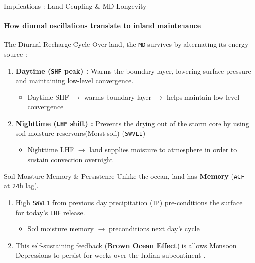 \documentclass[8pt, aspectratio=169]{beamer}
\begin{document}
\begin{frame}{Implications : Land-Coupling \& MD Longevity}
    \framesubtitle{How diurnal oscillations translate to inland maintenance}

    \footnotesize
    \begin{block}{The Diurnal Recharge Cycle}
        Over land, the \texttt{MD} survives by alternating its energy source :
        \begin{enumerate}
            \footnotesize
            \item \textbf{Daytime (\texttt{SHF} peak) :} Warms the boundary layer, lowering surface pressure and maintaining low-level convergence.
                \footnotesize
                \begin{itemize}
                    \tiny
                    \item Daytime SHF $\rightarrow$ warms boundary layer $\rightarrow$ helps maintain low-level convergence
                \end{itemize}
            \footnotesize
            \item \textbf{Nighttime (\texttt{LHF} shift) :} Prevents the drying out of the storm core by using soil moisture reservoirs(Moist soil) (\texttt{SWVL1}).
                \begin{itemize}
                    \tiny
                    \item Nighttime LHF $\rightarrow$ land supplies moisture to atmosphere in order to sustain convection overnight
                \end{itemize}
        \end{enumerate}
    \end{block}

    \footnotesize
    \begin{block}{Soil Moisture Memory \& Persistence}
        Unlike the ocean, land has \textbf{Memory} (\texttt{ACF} at \texttt{24h} lag).
        \begin{enumerate}
            \item High \texttt{SWVL1} from previous day precipitation (\texttt{TP}) pre-conditions the surface for today's \texttt{LHF} release.
                \begin{itemize}
                    \tiny
                    \item Soil moisture memory $\rightarrow$ preconditions next day's cycle
                \end{itemize}
            \item This self-sustaining feedback (\textbf{Brown Ocean Effect}) is allows Monsoon Depressions to persist for weeks over the Indian subcontinent \cite{kishtawal2013tropical}.
        \end{enumerate}
    \end{block}


\end{frame}
\end{document}
